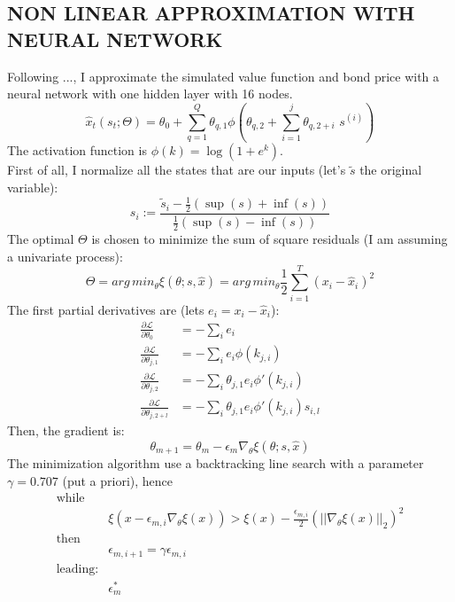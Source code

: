 \documentclass[11pt, a4paper]{article}
\theoremstyle{definition}
\begin{document}
	\subsection{NON LINEAR APPROXIMATION WITH NEURAL NETWORK}
	Following ..., I approximate the simulated value function and bond price with a neural network with one hidden layer with 16 nodes.
	\begin{equation}
		\hat{x}_t(s_t;\Theta) = \theta_0 + \sum_{q=1}^{Q} \theta_{q,1} \phi\left(\theta_{q,2}+\sum_{i=1}^{j}\theta_{q,2+i} \,\,s^{(i)}\right)
	\end{equation}
	The activation function is $\phi(k) = \log\left(1+e^{k}\right)$.\\
	First of all, I normalize all the states that are our inputs (let's $\tilde s$ the original variable):
	\begin{equation*}
		s_i := \frac{\tilde s_i - \frac{1}{2}(\sup(s)+\inf(s))}{\frac{1}{2}(\sup(s)-\inf(s))}
	\end{equation*}
	The optimal $\Theta$ is chosen to minimize the sum of square residuals (I am assuming a univariate process):
	\begin{equation}
		\Theta =arg\,min_{\theta}\xi(\theta; s,\hat x) = arg\,min_{\theta}\frac{1}{2}\sum_{i=1}^{T}(x_i-\hat{x}_i)^2
	\end{equation}
	The first partial derivatives are (lets $e_i = x_i - \hat x_i$):
	\begin{align}
		\frac{\partial \mathcal{L}}{\partial \theta_0} &= -\sum_i e_i \\
		\frac{\partial \mathcal{L}}{\partial \theta_{j,1}} &= -\sum_i e_i \phi(k_{j,i}) \\
		\frac{\partial \mathcal{L}}{\partial \theta_{j,2}} &= -\sum_i \theta_{j,1} e_i \phi'(k_{j,i}) \\
		\frac{\partial \mathcal{L}}{\partial \theta_{j,2+l}} &= -\sum_i \theta_{j,1} e_i \phi'(k_{j,i})s_{i,l}
	\end{align}
	Then, the gradient is:
	\begin{equation}
		\theta_{m+1} = \theta_m - \epsilon_m \nabla_{\theta} \xi(\theta; s,\hat x)
	\end{equation}
	The minimization algorithm use a backtracking line search with a parameter $\gamma = 0.707$ (put a priori), hence
	\begin{align*}
		\text{while}&\\
		&\xi(x -\epsilon_{m,i}\nabla_\theta \xi(x))> \xi(x) - \frac{\epsilon_{m,i}}{2}\left(||\nabla_\theta \xi(x)||_2 \right)^2\\
		\text{then}&\\
		& \epsilon_{m, i+1} = \gamma \epsilon_{m,i} \\
		\text{leading:}&\\
		& \epsilon_{m}^*
	\end{align*}
\end{document}
